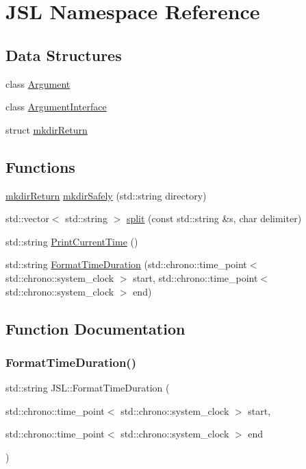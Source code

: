 \hypertarget{namespaceJSL}{}\section{J\+SL Namespace Reference}
\label{namespaceJSL}
\subsection*{Data Structures}
\begin{DoxyCompactItemize}
\item 
class \hyperlink{classJSL_1_1Argument}{Argument}
\item 
class \hyperlink{classJSL_1_1ArgumentInterface}{Argument\+Interface}
\item 
struct \hyperlink{structJSL_1_1mkdirReturn}{mkdir\+Return}
\end{DoxyCompactItemize}
\subsection*{Functions}
\begin{DoxyCompactItemize}
\item 
\hyperlink{structJSL_1_1mkdirReturn}{mkdir\+Return} \hyperlink{namespaceJSL_a1db6f26ec58c53d1a56375c0f1b27c77}{mkdir\+Safely} (std\+::string directory)
\item 
std\+::vector$<$ std\+::string $>$ \hyperlink{namespaceJSL_a34a7ba28084b304e97a707c653dce887}{split} (const std\+::string \&s, char delimiter)
\item 
std\+::string \hyperlink{namespaceJSL_a22fc26d87034a744e42e70e77db892df}{Print\+Current\+Time} ()
\item 
std\+::string \hyperlink{namespaceJSL_a5382fb9fe415f76c7dadd5f39dbad099}{Format\+Time\+Duration} (std\+::chrono\+::time\+\_\+point$<$ std\+::chrono\+::system\+\_\+clock $>$ start, std\+::chrono\+::time\+\_\+point$<$ std\+::chrono\+::system\+\_\+clock $>$ end)
\end{DoxyCompactItemize}


\subsection{Function Documentation}
\mbox{\label{namespaceJSL_a5382fb9fe415f76c7dadd5f39dbad099}} 
\subsubsection{\texorpdfstring{Format\+Time\+Duration()}{FormatTimeDuration()}}
{\footnotesize\ttfamily std\+::string J\+S\+L\+::\+Format\+Time\+Duration (\begin{DoxyParamCaption}\item[{std\+::chrono\+::time\+\_\+point$<$ std\+::chrono\+::system\+\_\+clock $>$}]{start,  }\item[{std\+::chrono\+::time\+\_\+point$<$ std\+::chrono\+::system\+\_\+clock $>$}]{end }\end{DoxyParamCaption})\hspace{0.3cm}{\ttfamily [inline]}}

